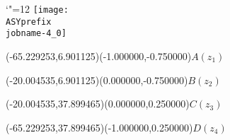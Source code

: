 \setlength{\unitlength}{1pt}%
\makeatletter%
\let\ASYencoding\f@encoding%
\let\ASYfamily\f@family%
\let\ASYseries\f@series%
\let\ASYshape\f@shape%
\makeatother%
{\catcode`"=12%
\texttt{[image: \\ASYprefix\\jobname-4\_0]}%
}%
%
\fontsize{6.000000}{7.200000}\selectfont%
\usefont{\ASYencoding}{\ASYfamily}{\ASYseries}{\ASYshape}%
\ASYalign(-65.229253,6.901125)(-1.000000,-0.750000){$A(z_1)$}%
%
\fontsize{6.000000}{7.200000}\selectfont%
\ASYalign(-20.004535,6.901125)(0.000000,-0.750000){$B(z_2)$}%
%
\fontsize{6.000000}{7.200000}\selectfont%
\ASYalign(-20.004535,37.899465)(0.000000,0.250000){$C(z_3)$}%
%
\fontsize{6.000000}{7.200000}\selectfont%
\ASYalign(-65.229253,37.899465)(-1.000000,0.250000){$D(z_4)$}%
